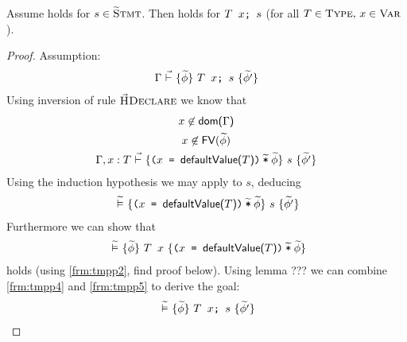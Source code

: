 \begin{lemma}
    \label{lemma:is-decl}
    Assume  holds for $s \in \textup{\textsc{\ensuremath{\widetilde{\text{S}}}tmt}}$.
    Then  holds for $\textup{\texttt{{\textup{\texttt{$T$~$x$}}};~{$s$}}}$ (for all $T \in \textup{\textsc{Type}},\, x \in \textup{\textsc{Var}}$).
\end{lemma}
\begin{proof}
    Assumption:
    \begin{align}
    {\Gamma} \,\,\vec{\vdash}\,\, \{{\widetilde{\phi}}\} ~{\textup{\texttt{{\textup{\texttt{${T}$~${x}$}}};~{$s$}}}}~ \{{\widetilde{\phi'}}\}
    \end{align}
    Using inversion of rule $\textup{\textsc{\ensuremath{\vec{\text{H}}}Declare}}$ we know that
    \begin{gather}
    \label{frm:tmpp1}
    {x} \not\in \textup{\textmd{\textsf{dom($\Gamma$)}}} \\
    \label{frm:tmpp2}
    {x} \not \in {\textup{\textmd{\textsf{FV}}}(\widetilde{\phi})} \\
    {{\Gamma}, {x} : {T}} \,\,\vec{\vdash}\,\, \{{\textup{\texttt{${\textup{\texttt{(${\textup{\texttt{${x}$}}}$ = ${\textup{\texttt{${\textup{\textmd{\textsf{defaultValue(${T}$)}}}}$}}}$)}}}$\:$\widetilde{\textup{\texttt{*}}}$\:$\widetilde{\phi}$}}}\} ~{s}~ \{{\widetilde{\phi'}}\}
    \end{gather}
    Using the induction hypothesis we may apply  to $s$, deducing
    \begin{gather}
    \label{frm:tmpp4}
    {} \,\,\widetilde{\vDash}\,\, \{{\textup{\texttt{${\textup{\texttt{(${\textup{\texttt{${x}$}}}$ = ${\textup{\texttt{${\textup{\textmd{\textsf{defaultValue(${T}$)}}}}$}}}$)}}}$\:$\widetilde{\textup{\texttt{*}}}$\:$\widetilde{\phi}$}}}\} ~{s}~ \{{\widetilde{\phi'}}\}
    \end{gather}
    Furthermore we can show that
    \begin{gather}
    \label{frm:tmpp5}
    {} \,\,\widetilde{\vDash}\,\, \{{\widetilde{\phi}}\} ~{\textup{\texttt{${T}$~${x}$}}}~ \{{\textup{\texttt{${\textup{\texttt{(${\textup{\texttt{${x}$}}}$ = ${\textup{\texttt{${\textup{\textmd{\textsf{defaultValue(${T}$)}}}}$}}}$)}}}$\:$\widetilde{\textup{\texttt{*}}}$\:$\widetilde{\phi}$}}}\}
    \end{gather}
    holds (using \ref{frm:tmpp2}, find proof below).
    Using lemma ??? we can combine \ref{frm:tmpp4} and \ref{frm:tmpp5} to derive the goal:
    \begin{align}
    {} \,\,\widetilde{\vDash}\,\, \{{\widetilde{\phi}}\} ~{\textup{\texttt{{\textup{\texttt{${T}$~${x}$}}};~{$s$}}}}~ \{{\widetilde{\phi'}}\}
    \end{align}
    

\end{proof}
